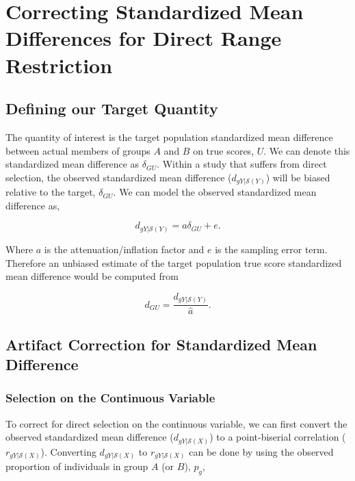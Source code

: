 \documentclass[
  letterpaper,
  DIV=11,
  numbers=noendperiod]{scrreprt}
\begin{document}
\hypertarget{correcting-standardized-mean-differences-for-direct-range-restriction}{%
\section{Correcting Standardized Mean Differences for Direct Range
Restriction}\label{correcting-standardized-mean-differences-for-direct-range-restriction}}

\hypertarget{defining-our-target-quantity-5}{%
\subsection{Defining our Target
Quantity}\label{defining-our-target-quantity-5}}

The quantity of interest is the target population standardized mean
difference between actual members of groups \(A\) and \(B\) on true
scores, \(U\). We can denote this standardized mean difference as
\(\delta_{GU}\). Within a study that suffers from direct selection, the
observed standardized mean difference (\(d_{gY|\mathcal{S}(Y)}\)) will
be biased relative to the target, \(\delta_{GU}\). We can model the
observed standardized mean difference as,

\[
d_{gY|\mathcal{S}(Y)}= a \delta_{GU} + e.
\]

Where \(a\) is the attenuation/inflation factor and \(e\) is the
sampling error term. Therefore an unbiased estimate of the target
population true score standardized mean difference would be computed
from

\[
d_{GU} = \frac{ d_{gY|\mathcal{S}(Y)} }{ \hat{a}}.
\]

\hypertarget{artifact-correction-for-standardized-mean-difference-1}{%
\subsection{Artifact Correction for Standardized Mean
Difference}\label{artifact-correction-for-standardized-mean-difference-1}}

\hypertarget{selection-on-the-continuous-variable}{%
\subsubsection{Selection on the Continuous
Variable}\label{selection-on-the-continuous-variable}}

To correct for direct selection on the continuous variable, we can first
convert the observed standardized mean difference
(\(d_{gY|\mathcal{S}(X)}\)) to a point-biserial correlation
(\(r_{gY|\mathcal{S}(X)}\)). Converting \(d_{gY|\mathcal{S}(X)}\) to
\(r_{gY|\mathcal{S}(X)}\) can be done by using the observed proportion
of individuals in group \(A\) (or \(B\)), \(p_g\),
\end{document}
